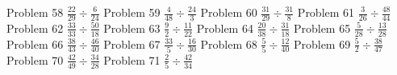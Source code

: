 \documentclass{article}
\begin{document}
\hfill \break
Problem 58
\newline
\hfill \break
$\displaystyle \frac{22}{29} \div \frac{6}{24}$
\newline
\hfill \break
Problem 59
\newline
\hfill \break
$\displaystyle \frac{4}{48} \div \frac{24}{3}$
\newline
\hfill \break
Problem 60
\newline
\hfill \break
$\displaystyle \frac{31}{29} \div \frac{31}{8}$
\newline
\hfill \break
Problem 61
\newline
\hfill \break
$\displaystyle \frac{3}{26} \div \frac{48}{44}$
\newline
\hfill \break
Problem 62
\newline
\hfill \break
$\displaystyle \frac{33}{33} \div \frac{50}{18}$
\newline
\hfill \break
Problem 63
\newline
\hfill \break
$\displaystyle \frac{9}{2} \div \frac{11}{22}$
\newline
\hfill \break
Problem 64
\newline
\hfill \break
$\displaystyle \frac{20}{38} \div \frac{31}{18}$
\newline
\hfill \break
Problem 65
\newline
\hfill \break
$\displaystyle \frac{5}{28} \div \frac{13}{28}$
\newline
\hfill \break
Problem 66
\newline
\hfill \break
$\displaystyle \frac{38}{43} \div \frac{46}{40}$
\newline
\hfill \break
Problem 67
\newline
\hfill \break
$\displaystyle \frac{33}{5} \div \frac{16}{30}$
\newline
\hfill \break
Problem 68
\newline
\hfill \break
$\displaystyle \frac{5}{5} \div \frac{12}{40}$
\newline
\hfill \break
Problem 69
\newline
\hfill \break
$\displaystyle \frac{5}{2} \div \frac{38}{47}$
\newline
\hfill \break
Problem 70
\newline
\hfill \break
$\displaystyle \frac{42}{49} \div \frac{34}{28}$
\newline
\hfill \break
Problem 71
\newline
\hfill \break
$\displaystyle \frac{2}{5} \div \frac{42}{34}$
\newline
\hfill \break
\end{document}

